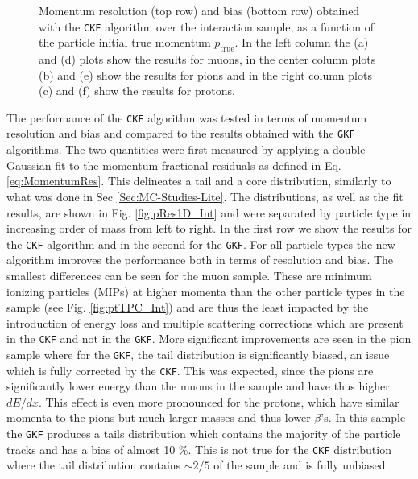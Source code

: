 \begin{figure}[t]
\begin{subfigure}{0.32\textwidth}
         \caption{}
         \label{fig:pBiasVSp2212_Int}
     \end{subfigure}
        \caption[Momentum resolution (top row) and bias (bottom row) obtained with the \texttt{CKF}  algorithm over the interaction sample, as a function of the particle initial true momentum.]{Momentum resolution (top row) and bias (bottom row) obtained with the \texttt{CKF}  algorithm over the interaction sample, as a function of the particle initial true momentum $p_\text{true}$. In the left column the (a) and (d) plots show the results for muons, in the center column plots (b) and (e) show the results for pions and in the right column plots (c) and (f) show the results for protons.}
        \label{fig:pRes2Dp_Int}
\end{figure}

The performance of the \texttt{CKF} algorithm was tested in terms of momentum resolution and bias and compared to the results obtained with the \texttt{GKF} algorithms. The two quantities were first measured by applying a double-Gaussian fit to the momentum fractional residuals as defined in Eq. \ref{eq:MomentumRes}. This delineates a tail and a core distribution, similarly to what was done in Sec \ref{Sec:MC-Studies-Lite}. The distributions, as well as the fit results, are shown in Fig. \ref{fig:pRes1D_Int} and were separated by particle type in increasing order of mass from left to right. In the first row we show the results for the \texttt{CKF} algorithm and in the second for the \texttt{GKF}. For all particle types the new algorithm improves the performance both in terms of resolution and bias. The smallest differences can be seen for the muon sample. These are minimum ionizing particles (MIPs) at higher momenta than the other particle types in the sample (see Fig. \ref{fig:ptTPC_Int}) and are thus the least impacted by the introduction of energy loss and multiple scattering corrections which are present in the \texttt{CKF} and not in the \texttt{GKF}. More significant improvements are seen in the pion sample where for the \texttt{GKF}, the tail distribution is significantly biased, an issue which is fully corrected by the \texttt{CKF}. This was expected, since the pions are significantly lower energy than the muons in the sample and have thus higher $dE/dx$. This effect is even more pronounced for the protons, which have similar momenta to the pions but much larger masses and thus lower $\beta$'s. In this sample the \texttt{GKF} produces a tails distribution which contains the majority of the particle tracks and has a bias of almost 10 \%. This is not true for the \texttt{CKF} distribution where the tail distribution contains $\sim2/5$ of the sample and is fully unbiased.

